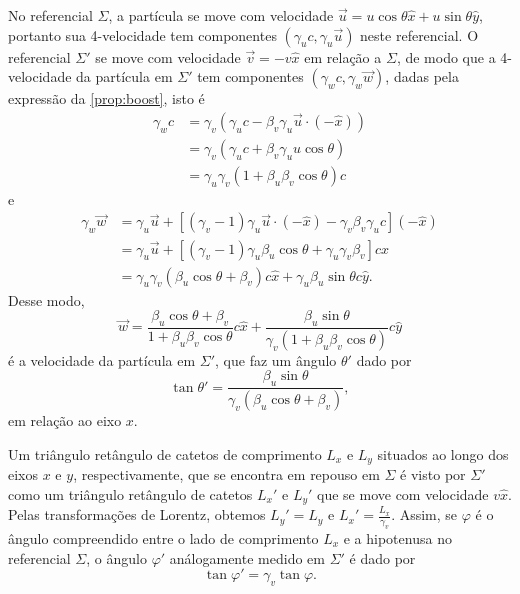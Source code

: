 \documentclass[12pt,a4paper]{article}
\numberwithin{equation}{section}
\begin{document}
No referencial \(\Sigma\), a partícula se move com velocidade \(\vec{u} = u \cos \theta \hat{x} + u \sin \theta \hat{y}\), portanto sua 4-velocidade tem componentes \((\gamma_u c, \gamma_u \vec{u})\) neste referencial. O referencial \(\Sigma'\) se move com velocidade \(\vec{v} = -v\hat{x}\) em relação a \(\Sigma\), de modo que a 4-velocidade da partícula em \(\Sigma'\) tem componentes \((\gamma_w c, \gamma_w \vec{w})\), dadas pela expressão da \cref{prop:boost}, isto é
\begin{align*}
    \gamma_w c &= \gamma_v (\gamma_u c - \beta_v \gamma_u \vec{u} \cdot (-\hat{x}))\\
               &= \gamma_v(\gamma_u c + \beta_v \gamma_u u \cos\theta)\\
               &= \gamma_u \gamma_v (1 + \beta_u \beta_v \cos\theta) c
\end{align*}
e
\begin{align*}
    \gamma_w \vec{w} &= \gamma_u \vec{u} + \left[(\gamma_v - 1)\gamma_u \vec{u} \cdot (-\hat{x}) - \gamma_v \beta_v \gamma_u c\right](-\hat{x})\\
                     &= \gamma_u \vec{u} + \left[(\gamma_v - 1)\gamma_u \beta_u \cos\theta + \gamma_u \gamma_v \beta_v\right]c\hat{x}\\
                     &= \gamma_u \gamma_v \left(\beta_u \cos\theta + \beta_v\right) c\hat{x} + \gamma_u \beta_u \sin \theta c \hat{y}.
\end{align*}
Desse modo,
\begin{equation*}
    \vec{w} = \frac{\beta_u \cos\theta + \beta_v}{1 + \beta_u \beta_v \cos\theta} c \hat{x} + \frac{\beta_u \sin \theta}{\gamma_v \left(1 + \beta_u \beta_v \cos \theta\right)} c \hat{y}
\end{equation*}
é a velocidade da partícula em \(\Sigma'\), que faz um ângulo \(\theta'\) dado por
\begin{equation*}
    \tan \theta' = \frac{\beta_u \sin\theta}{\gamma_v \left(\beta_u \cos\theta + \beta_v\right)},
\end{equation*}
em relação ao eixo \(x\).

Um triângulo retângulo de catetos de comprimento \(L_x\) e \(L_y\) situados ao longo dos eixos \(x\) e \(y\), respectivamente, que se encontra em repouso em \(\Sigma\) é visto por \(\Sigma'\) como um triângulo retângulo de catetos \(L_x'\) e \(L_y'\) que se move com velocidade \(v\hat{x}\). Pelas transformações de Lorentz, obtemos \(L_y' = L_y\) e \(L_x' = \frac{L_x}{\gamma_v}\). Assim, se \(\varphi\) é o ângulo compreendido entre o lado de comprimento \(L_x\) e a hipotenusa no referencial \(\Sigma\), o ângulo \(\varphi'\) análogamente medido em \(\Sigma'\) é dado por
\begin{equation*}
    \tan \varphi' = \gamma_v \tan \varphi.
\end{equation*}
\end{document}
